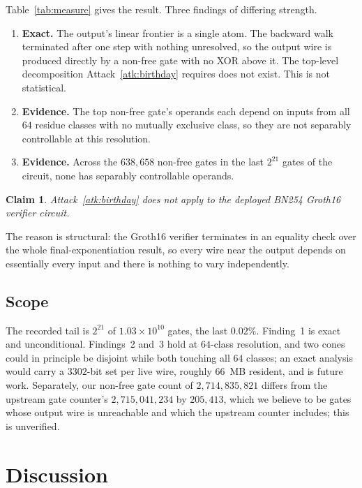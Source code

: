 \documentclass[11pt,a4paper]{article}
\theoremstyle{definition}
\theoremstyle{plain}
\newtheorem{claim}{Claim}
\begin{document}
Table~\ref{tab:measure} gives the result. Three findings of differing strength.

\begin{enumerate}[leftmargin=*,itemsep=2pt]
  \item \textbf{Exact.} The output's linear frontier is a single atom. The
    backward walk terminated after one step with nothing unresolved, so the
    output wire is produced directly by a non-free gate with no XOR above it.
    The top-level decomposition Attack~\ref{atk:birthday} requires does not
    exist. This is not statistical.
  \item \textbf{Evidence.} The top non-free gate's operands each depend on
    inputs from all $64$ residue classes with no mutually exclusive class, so
    they are not separably controllable at this resolution.
  \item \textbf{Evidence.} Across the $638{,}658$ non-free gates in the last
    $2^{21}$ gates of the circuit, none has separably controllable operands.
\end{enumerate}

\begin{claim}
Attack~\ref{atk:birthday} does not apply to the deployed BN254 Groth16 verifier
circuit.
\end{claim}

The reason is structural: the Groth16 verifier terminates in an equality check
over the whole final-exponentiation result, so every wire near the output
depends on essentially every input and there is nothing to vary independently.

\subsection{Scope}

The recorded tail is $2^{21}$ of $1.03 \times 10^{10}$ gates, the last
$0.02\%$. Finding~1 is exact and unconditional. Findings~2 and~3 hold at
$64$-class resolution, and two cones could in principle be disjoint while both
touching all $64$ classes; an exact analysis would carry a $3302$-bit set per
live wire, roughly $66$~MB resident, and is future work. Separately, our
non-free gate count of $2{,}714{,}835{,}821$ differs from the upstream gate
counter's $2{,}715{,}041{,}234$ by $205{,}413$, which we believe to be gates
whose output wire is unreachable and which the upstream counter includes; this
is unverified.

\section{Discussion}
\end{document}
